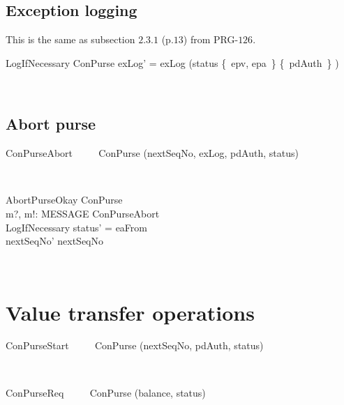 \subsection{Exception logging}

This is the same as subsection $2.3.1$ (p.$13$) from PRG-$126$.
\begin{LSDef}
\begin{schema}{LogIfNecessary}
   \Delta ConPurse
\where
   exLog' = exLog \cup (\IF status \in \{~epv, epa~\} \THEN \{~pdAuth~\} \ELSE \emptyset)
\end{schema}~\end{LSDef}

\subsection{Abort purse}

\begin{LSDef}
\begin{zed}
   ConPurseAbort ~~~~ ConPurse \hide (nextSeqNo, exLog, pdAuth, status)
\end{zed}~\end{LSDef}

\begin{LSDef}
\begin{schema}{AbortPurseOkay}
   \Delta ConPurse \\
   m?, m!: MESSAGE
\where
  \Xi ConPurseAbort \\
  LogIfNecessary
  \also
  status' = eaFrom \\
  nextSeqNo' \geq nextSeqNo \\
\end{schema}~\end{LSDef}

\section{Value transfer operations}\label{ch4.valTransferOp}

\begin{LSDef}
\begin{zed}
   ConPurseStart ~~~~ ConPurse \hide (nextSeqNo, pdAuth, status)
\end{zed}~\end{LSDef}

\begin{LSDef}
\begin{zed}
   ConPurseReq ~~~~ ConPurse \hide (balance, status)
\end{zed}~\end{LSDef}

